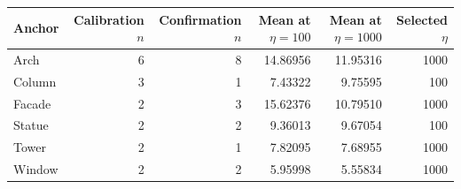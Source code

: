 \begin{tabular}{lrrrrr}
\toprule
Anchor & Calibration $n$ & Confirmation $n$ & Mean at $\eta=100$ & Mean at $\eta=1000$ & Selected $\eta$ \\
\midrule
Arch & 6 & 8 & 14.86956 & 11.95316 & 1000 \\
Column & 3 & 1 & 7.43322 & 9.75595 & 100 \\
Facade & 2 & 3 & 15.62376 & 10.79510 & 1000 \\
Statue & 2 & 2 & 9.36013 & 9.67054 & 100 \\
Tower & 2 & 1 & 7.82095 & 7.68955 & 1000 \\
Window & 2 & 2 & 5.95998 & 5.55834 & 1000 \\
\bottomrule
\end{tabular}
